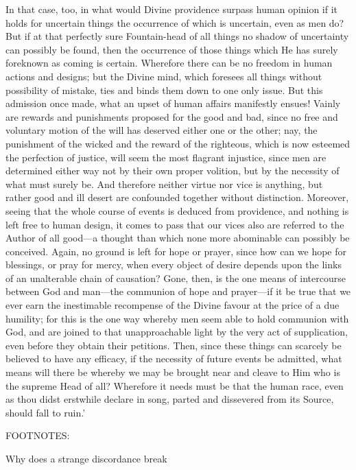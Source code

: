 In that case, too, in what would Divine providence surpass human opinion
if it holds for uncertain things the occurrence of which is uncertain,
even as men do? But if at that perfectly sure Fountain-head of all
things no shadow of uncertainty can possibly be found, then the
occurrence of those things which He has surely foreknown as coming is
certain. Wherefore there can be no freedom in human actions and designs;
but the Divine mind, which foresees all things without possibility of
mistake, ties and binds them down to one only issue. But this admission
once made, what an upset of human affairs manifestly ensues! Vainly are
rewards and punishments proposed for the good and bad, since no free and
voluntary motion of the will has deserved either one or the other; nay,
the punishment of the wicked and the reward of the righteous, which is
now esteemed the perfection of justice, will seem the most flagrant
injustice, since men are determined either way not by their own proper
volition, but by the necessity of what must surely be. And therefore
neither virtue nor vice is anything, but rather good and ill desert are
confounded together without distinction. Moreover, seeing that the whole
course of events is deduced from providence, and nothing is left free to
human design, it comes to pass that our vices also are referred to the
Author of all good—a thought than which none more abominable can
possibly be conceived. Again, no ground is left for hope or prayer,
since how can we hope for blessings, or pray for mercy, when every
object of desire depends upon the links of an unalterable chain of
causation? Gone, then, is the one means of intercourse between God and
man—the communion of hope and prayer—if it be true that we ever earn
the inestimable recompense of the Divine favour at the price of a due
humility; for this is the one way whereby men seem able to hold
communion with God, and are joined to that unapproachable light by the
very act of supplication, even before they obtain their petitions. Then,
since these things can scarcely be believed to have any efficacy, if the
necessity of future events be admitted, what means will there be whereby
we may be brought near and cleave to Him who is the supreme Head of all?
Wherefore it needs must be that the human race, even as thou didst
erstwhile declare in song, parted and dissevered from its Source, should
fall to ruin.'

FOOTNOTES:


Why does a strange discordance break

